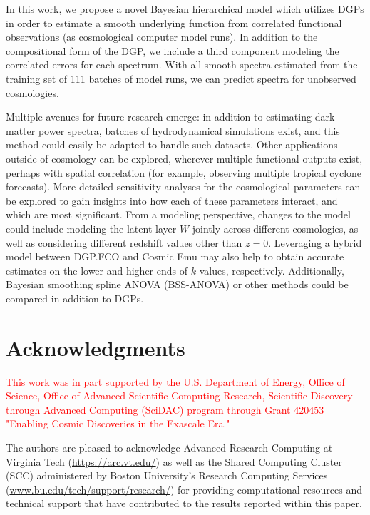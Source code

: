 \documentclass[11pt]{article}
\begin{document}
In this work, we propose a novel Bayesian hierarchical model which utilizes DGPs 
in order to estimate a smooth underlying function from correlated functional observations 
(as cosmological computer model runs). In addition to the compositional form of the DGP, 
we include a third component modeling the correlated errors for each spectrum. 
With all smooth spectra estimated from the training set of 111 batches of model runs, 
we can predict spectra for unobserved cosmologies.

Multiple avenues for future research emerge: in addition to estimating dark matter 
power spectra, batches of hydrodynamical simulations exist, and this method could 
easily be adapted to handle such datasets. Other applications outside of cosmology 
can be explored, wherever multiple functional outputs exist, perhaps with spatial 
correlation (for example, observing multiple tropical cyclone forecasts). More detailed 
sensitivity analyses for the cosmological parameters can be explored to gain insights 
into how each of these parameters interact, and which are most significant. From a 
modeling perspective, changes to the model could include modeling the latent layer 
$W$ jointly across different cosmologies, as well as considering different redshift 
values other than $z=0$. Leveraging a hybrid model between DGP.FCO and Cosmic Emu 
may also help to obtain accurate estimates on the lower and higher ends of $k$ values, 
respectively. Additionally, Bayesian smoothing spline ANOVA (BSS-ANOVA) or other methods 
could be compared in addition to DGPs. 

\section{Acknowledgments}
\label{sec:ack}

\textcolor{red}{This work was in part supported by the U.S. Department
of Energy, Office of Science, Office of Advanced Scientific Computing Research, 
Scientific Discovery through Advanced Computing (SciDAC) program through 
Grant 420453 "Enabling Cosmic Discoveries in the Exascale Era."}

The authors are pleased to acknowledge Advanced Research Computing at Virginia Tech 
(\url{https://arc.vt.edu/}) as well as the Shared Computing Cluster (SCC) administered
by Boston University's Research Computing Services (\url{www.bu.edu/tech/support/research/})
for providing computational resources and technical support that have contributed 
to the results reported within this paper.
\end{document}
